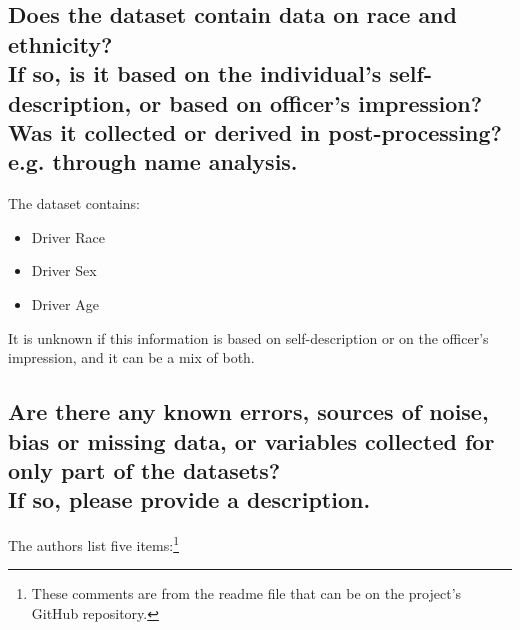 \documentclass[letterpaper, 10 pt, conference]{ieeeconf}  %
\newcommand{\subtitle}[1]{{\\ \small \normalfont \color{purple} #1}}
\begin{document}
\subsection{Does the dataset contain data on race and ethnicity? \subtitle{If so, is it based on the individual's self-description, or based on officer's impression? Was it collected or derived in post-processing? e.g. through name analysis.}}

The dataset contains:

 \begin{itemize}
     \item Driver Race
     \item Driver Sex
     \item Driver Age
 \end{itemize}

It is unknown if this information is based on self-description or on the officer's impression, and it can be a mix of both. 

\subsection{Are there any known errors, sources of noise, bias or missing data, or variables collected for only part of the datasets? \subtitle{If so, please provide a description.}}
\label{sec:errors}
The authors list five items:\footnote{These comments are from the readme file that can be on the project's GitHub repository.}
\end{document}

